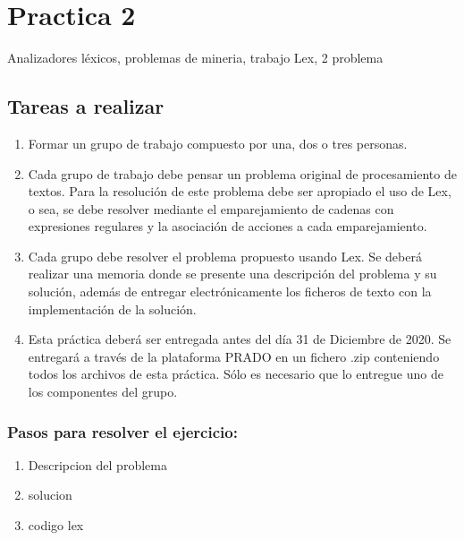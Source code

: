 \documentclass{article}
\begin{document}
        \newpage


        \section*{Practica 2}
        Analizadores léxicos, problemas de mineria, trabajo Lex, 2 problema
        \subsection*{Tareas a realizar}
        \begin{enumerate}
        \item Formar un grupo de trabajo compuesto por una, dos o tres personas.
        \item Cada grupo de trabajo debe pensar un problema original de procesamiento de textos. Para la resolución de este problema debe ser apropiado el uso de Lex, o sea, se debe resolver mediante el emparejamiento de cadenas con expresiones regulares y la asociación de acciones a cada emparejamiento.
        \item Cada grupo debe resolver el problema propuesto usando Lex. Se deberá realizar una memoria donde se presente una descripción del problema y su solución, además de entregar electrónicamente los ficheros de texto con la implementación de la solución.
        \item Esta práctica deberá ser entregada antes del día 31 de Diciembre de 2020. Se entregará a través de la plataforma PRADO en un fichero .zip conteniendo todos los archivos de esta práctica. Sólo es necesario que lo entregue uno de los componentes del grupo.
        \end{enumerate}

        \vspace{\baselineskip} %


        \begin{flushleft}
            
            \subsubsection*{Pasos para resolver el ejercicio:}
                        
            \begin{enumerate}
                \item Descripcion del problema 
                \item solucion 
                \item codigo lex
            \end{enumerate}
        \end{flushleft}
\end{document}
